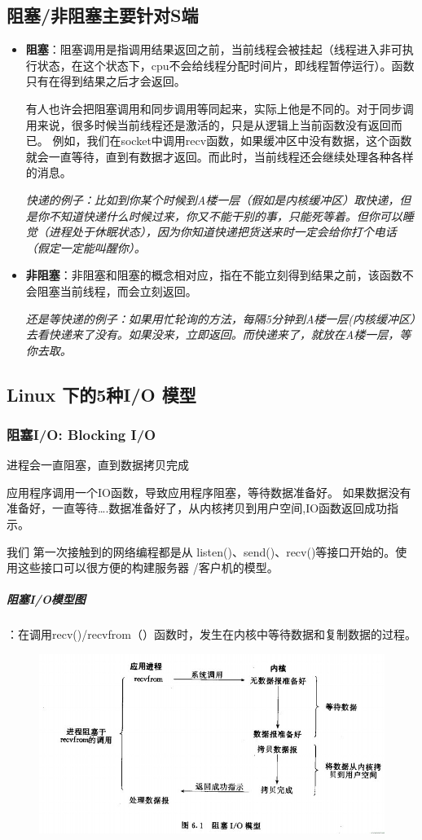 \documentclass[UTF8,a4paper,12pt]{ctexbook}
\begin{document}
		\subsection{阻塞/非阻塞主要针对S端}
			\begin{itemize}
				\item \textbf{阻塞}：阻塞调用是指调用结果返回之前，当前线程会被挂起（线程进入非可执行状态，在这个状态下，cpu不会给线程分配时间片，即线程暂停运行）。函数只有在得到结果之后才会返回。
				
				有人也许会把阻塞调用和同步调用等同起来，实际上他是不同的。对于同步调用来说，很多时候当前线程还是激活的，只是从逻辑上当前函数没有返回而已。 例如，我们在socket中调用recv函数，如果缓冲区中没有数据，这个函数就会一直等待，直到有数据才返回。而此时，当前线程还会继续处理各种各样的消息。
				
				\textit{快递的例子：比如到你某个时候到A楼一层（假如是内核缓冲区）取快递，但是你不知道快递什么时候过来，你又不能干别的事，只能死等着。但你可以睡觉（进程处于休眠状态），因为你知道快递把货送来时一定会给你打个电话（假定一定能叫醒你）。}
				\item \textbf{非阻塞}：非阻塞和阻塞的概念相对应，指在不能立刻得到结果之前，该函数不会阻塞当前线程，而会立刻返回。
				
				\textit{还是等快递的例子：如果用忙轮询的方法，每隔5分钟到A楼一层(内核缓冲区）去看快递来了没有。如果没来，立即返回。而快递来了，就放在A楼一层，等你去取。}
			\end{itemize}
		\subsection{Linux 下的5种I/O 模型}
			\subsubsection{阻塞I/O: Blocking I/O}进程会一直阻塞，直到数据拷贝完成
			
			应用程序调用一个IO函数，导致应用程序阻塞，等待数据准备好。 如果数据没有准备好，一直等待….数据准备好了，从内核拷贝到用户空间,IO函数返回成功指示。
			
			我们 第一次接触到的网络编程都是从 listen()、send()、recv()等接口开始的。使用这些接口可以很方便的构建服务器 /客户机的模型。
			
			\subparagraph{阻塞I/O模型图}：在调用recv()/recvfrom（）函数时，发生在内核中等待数据和复制数据的过程。
			\begin{figure}[h]
				\centering
				\includegraphics[scale = 0.8]{figures/BlockingIO.jpg}
			\end{figure}
			
\end{document}
